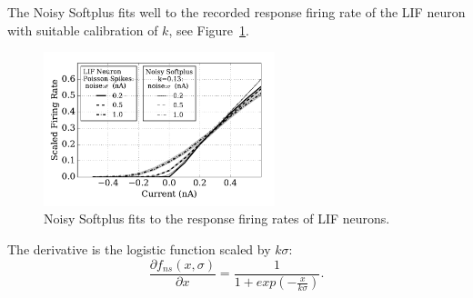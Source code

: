	
	The Noisy Softplus fits well to the recorded response firing rate of the LIF neuron with suitable calibration of $k$, see Figure~\ref{Fig:nsptau1}.
	
	\begin{figure}
		\centering
		\includegraphics[width=0.6\textwidth]{pics_iconip/4-1.pdf}
		\caption{Noisy Softplus fits to the response firing rates of LIF neurons.}
		\label{Fig:nsptau1}
	\end{figure}		
	
	The derivative is the logistic function scaled by $k\sigma$:
	\begin{equation}
	\frac{\partial f_{ns}(x,\sigma)}{\partial x} = \frac{1}{1+exp(-\frac{x}{k\sigma})}.
	\label{equ:logist}
	\end{equation}	
	
